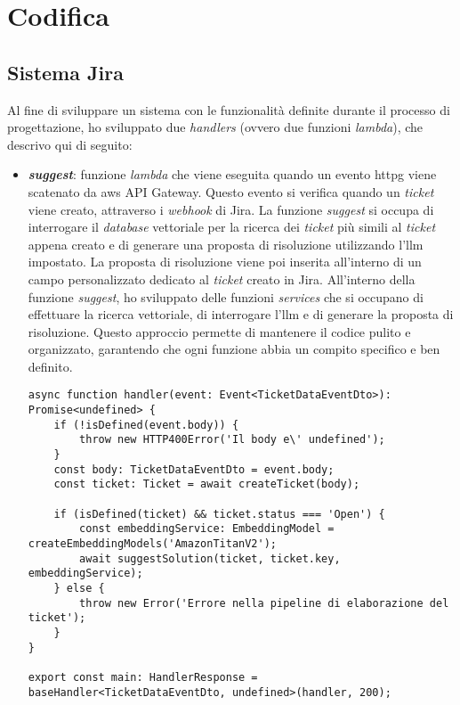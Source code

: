 \section{Codifica}
\subsection{Sistema Jira}

Al fine di sviluppare un sistema con le funzionalità definite durante il processo di progettazione, ho sviluppato due \textit{handlers} (ovvero due funzioni \textit{lambda}), che descrivo qui di seguito:

\begin{itemize}
    \item \textbf{\textit{suggest}}: funzione \textit{lambda} che viene eseguita quando un evento \gls{httpg} viene scatenato da \gls{aws} API Gateway. Questo evento si verifica quando un \textit{ticket} viene creato, attraverso i \textit{webhook} di Jira. La funzione \textit{suggest} si occupa di interrogare il \textit{database} vettoriale per la ricerca dei \textit{ticket} più simili al \textit{ticket} appena creato e di generare una proposta di risoluzione utilizzando l'\gls{llm} impostato. La proposta di risoluzione viene poi inserita all'interno di un campo personalizzato dedicato al \textit{ticket} creato in Jira.
    All'interno della funzione \textit{suggest}, ho sviluppato delle funzioni \textit{services} che si occupano di effettuare la ricerca vettoriale, di interrogare l'\gls{llm} e di generare la proposta di risoluzione. Questo approccio permette di mantenere il codice pulito e organizzato, garantendo che ogni funzione abbia un compito specifico e ben definito.
    \begin{verbatim}
async function handler(event: Event<TicketDataEventDto>): Promise<undefined> {
    if (!isDefined(event.body)) {
        throw new HTTP400Error('Il body e\' undefined');
    }
    const body: TicketDataEventDto = event.body;
    const ticket: Ticket = await createTicket(body);

    if (isDefined(ticket) && ticket.status === 'Open') {
        const embeddingService: EmbeddingModel = createEmbeddingModels('AmazonTitanV2');
        await suggestSolution(ticket, ticket.key, embeddingService);
    } else {
        throw new Error('Errore nella pipeline di elaborazione del ticket');
    }
}

export const main: HandlerResponse = baseHandler<TicketDataEventDto, undefined>(handler, 200);
    \end{verbatim}
    \vspace{-0.3cm}
    \vspace{0.2cm}


\end{itemize}
